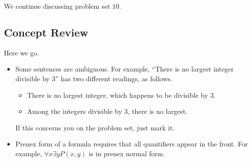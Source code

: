 
We continue discussing problem set $10$.

\subsection{Concept Review}
Here we go.
\begin{itemize}
	\item Some sentences are ambiguous. For example, ``There is no largest integer divisible by $3$'' has two different readings, as follows.
	\begin{itemize}
		\item There is no largest integer, which happens to be divisible by $3$.
		\item Among the integers divisible by $3$, there is no largest.
	\end{itemize}
	If this concerns you on the problem set, just mark it.
	\item Prenex form of a formula requires that all quantifiers appear in the front. For example, $\forall x\exists yP(x,y)$ is in prenex normal form.
\end{itemize}